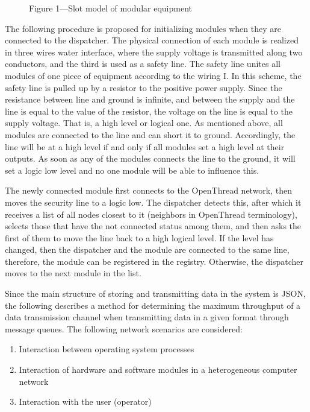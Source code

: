 \begin{figure} [ht]
\caption *{Figure 1---Slot model of modular equipment} \label{fig: main-arch}
\end{figure}

The following procedure is proposed for initializing modules when they are connected to the dispatcher. The physical connection of each module is realized in three wires water interface, where the supply voltage is transmitted along two conductors, and the third is used as a safety line. The safety line unites all modules of one piece of equipment according to the wiring I. In this scheme, the safety line is pulled up by a resistor to the positive power supply. Since the resistance between line and ground is infinite, and between the supply and the line is equal to the value of the resistor, the voltage on the line is equal to the supply voltage. That is, a high level or logical one. As mentioned above, all modules are connected to the line and can short it to ground. Accordingly, the line will be at a high level if and only if all modules set a high level at their outputs. As soon as any of the modules connects the line to the ground, it will set a logic low level and no one module will be able to influence this.

The newly connected module first connects to the OpenThread network, then moves the security line to a logic low. The dispatcher detects this, after which it receives a list of all nodes closest to it (neighbors in OpenThread terminology), selects those that have the not connected status among them, and then asks the first of them to move the line back to a high logical level. If the level has changed, then the dispatcher and the module are connected to the same line, therefore, the module can be registered in the registry. Otherwise, the dispatcher moves to the next module in the list.

Since the main structure of storing and transmitting data in the system is JSON, the following describes a method for determining the maximum throughput of a data transmission channel when transmitting data in a given format through message queues. The following network scenarios are considered:

\begin{enumerate}
\item Interaction between operating system processes
\item Interaction of hardware and software modules in a heterogeneous computer network
\item Interaction with the user (operator)
\end{enumerate}


